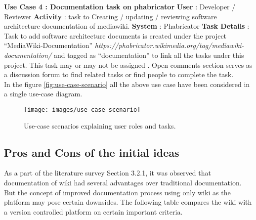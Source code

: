 \newline \newline
\indent \textbf{Use Case 4 : Documentation task on phabricator}
\newline \textbf{User} : Developer / Reviewer
\newline \textbf{Activity} : task to Creating / updating / reviewing software architecture documentation of mediawiki.
\newline \textbf{System} : Phabricator
\newline \textbf{Task Details} : Task to add software architecture documents is created under the project \enquote{MediaWiki-Documentation} \emph{https://phabricator.wikimedia.org/tag/mediawiki-documentation/} and tagged as \enquote{documentation} to link all the tasks under this project. This task may or may not be assigned . Open comments section serves as a discussion forum to find related tasks or find people to complete the task.
\newline
\\\indent In the figure \autoref{fig:use-case-scenario} all the above use case have been considered in a single use-case diagram.

\begin{figure}[H]
  \centering
  \texttt{[image: images/use-case-scenario]}
  \caption[Use-case scenarios explaining user roles and tasks]{Use-case scenarios explaining user roles and tasks.}\label{fig:use-case-scenario}
\end{figure}


\subsection{Pros and Cons of the initial ideas}

As a part of the literature survey Section 3.2.1, it was observed that documentation of wiki had several advantages over traditional documentation. But the concept of improved documentation process using only wiki as the platform may pose certain downsides. The following table compares the wiki with a version controlled platform on certain important criteria.

